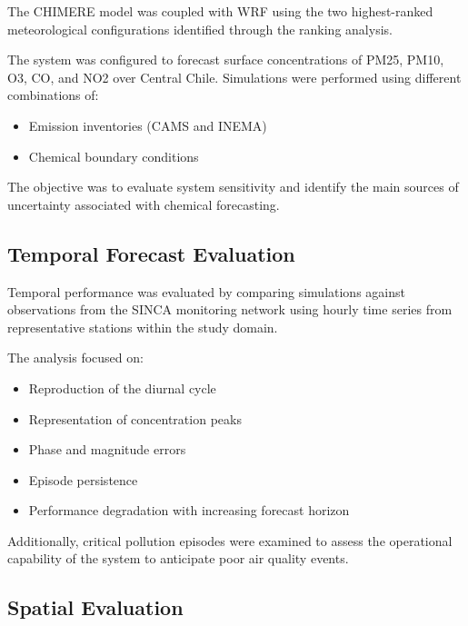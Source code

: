 \documentclass[
]{article}
\providecommand{\tightlist}{%
  \setlength{\itemsep}{0pt}\setlength{\parskip}{0pt}}
\begin{document}
The CHIMERE model was coupled with WRF using the two highest-ranked
meteorological configurations identified through the ranking analysis.

The system was configured to forecast surface concentrations of PM25,
PM10, O3, CO, and NO2 over Central Chile. Simulations were performed
using different combinations of:

\begin{itemize}
\tightlist
\item
  Emission inventories (CAMS and INEMA)\\
\item
  Chemical boundary conditions
\end{itemize}

The objective was to evaluate system sensitivity and identify the main
sources of uncertainty associated with chemical forecasting.

\subsection{\texorpdfstring{\textbf{Temporal Forecast
Evaluation}}{Temporal Forecast Evaluation}}\label{temporal-forecast-evaluation}

Temporal performance was evaluated by comparing simulations against
observations from the SINCA monitoring network using hourly time series
from representative stations within the study domain.

The analysis focused on:

\begin{itemize}
\tightlist
\item
  Reproduction of the diurnal cycle\\
\item
  Representation of concentration peaks\\
\item
  Phase and magnitude errors\\
\item
  Episode persistence\\
\item
  Performance degradation with increasing forecast horizon
\end{itemize}

Additionally, critical pollution episodes were examined to assess the
operational capability of the system to anticipate poor air quality
events.

\subsection{\texorpdfstring{\textbf{Spatial
Evaluation}}{Spatial Evaluation}}\label{spatial-evaluation}
\end{document}
